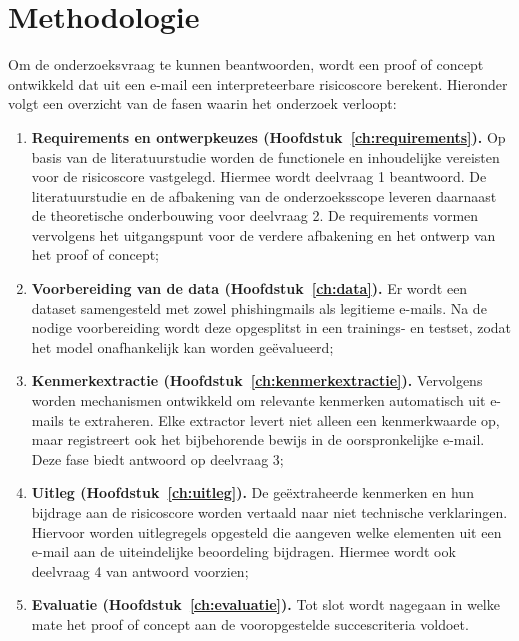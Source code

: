 \chapter{Methodologie}%
\label{ch:methodologie}

Om de onderzoeksvraag te kunnen beantwoorden, wordt een proof of concept ontwikkeld dat uit een e-mail een interpreteerbare risicoscore berekent. Hieronder volgt een overzicht van de fasen waarin het onderzoek verloopt:

\begin{enumerate}
    \item \textbf{Requirements en ontwerpkeuzes (Hoofdstuk~\ref{ch:requirements}).} Op basis van de literatuurstudie worden de functionele en inhoudelijke vereisten voor de risicoscore vastgelegd. Hiermee wordt deelvraag 1 beantwoord. De literatuurstudie en de afbakening van de onderzoeksscope leveren daarnaast de theoretische onderbouwing voor deelvraag 2. De requirements vormen vervolgens het uitgangspunt voor de verdere afbakening en het ontwerp van het proof of concept;
    \item \textbf{Voorbereiding van de data (Hoofdstuk~\ref{ch:data}).} Er wordt een dataset samengesteld met zowel phishingmails als legitieme e-mails. Na de nodige voorbereiding wordt deze opgesplitst in een trainings- en testset, zodat het model onafhankelijk kan worden geëvalueerd;
    \item \textbf{Kenmerkextractie (Hoofdstuk~\ref{ch:kenmerkextractie}).} Vervolgens worden mechanismen ontwikkeld om relevante kenmerken automatisch uit e-mails te extraheren. Elke extractor levert niet alleen een kenmerkwaarde op, maar registreert ook het bijbehorende bewijs in de oorspronkelijke e-mail. Deze fase biedt antwoord op deelvraag 3;
    \item \textbf{Uitleg (Hoofdstuk~\ref{ch:uitleg}).} De geëxtraheerde kenmerken en hun bijdrage aan de risicoscore worden vertaald naar niet technische verklaringen. Hiervoor worden uitlegregels opgesteld die aangeven welke elementen uit een e-mail aan de uiteindelijke beoordeling bijdragen. Hiermee wordt ook deelvraag 4 van antwoord voorzien;
    \item \textbf{Evaluatie (Hoofdstuk~\ref{ch:evaluatie}).} Tot slot wordt nagegaan in welke mate het proof of concept aan de vooropgestelde succescriteria voldoet.
\end{enumerate}





